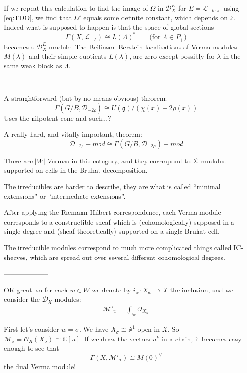 \documentclass[12pt]{article}
\theoremstyle{plain}
\theoremstyle{definition}
\numberwithin{equation}{section}
\newcommand{\M}{\mathcal{M}}
\newcommand{\bbA}{\mathbb{A}}
\newcommand{\la}{\lambda}
\newcommand{\La}{\Lambda}
\newcommand{\Om}{\Omega}
\newcommand{\C}{\mathbb{C}}
\newcommand{\g}{\mathfrak{g}}
\newcommand{\CD}{\mathcal{D}}
\newcommand{\CL}{\mathcal{L}}
\newcommand{\OO}{\mathcal{O}}
\begin{document}
If we repeat this calculation to find the image of $\Om$ in $\CD_X^E$ for $E = \CL_{-k\varpi}$ using \eqref{eq:TDO}, we find that $\Om'$ equals some definite constant, which depends on $k$. Indeed what is supposed to happen is that the space of global sections
\[
\Gamma(X, \CL_{-\La}) \cong L(\La)^* \qquad \text{(for $\La \in P_+$)}
\]
becomes a $\CD_X^{E}$-module. The Beilinson-Berstein localisations of Verma modules $M(\la)$ and their simple quotients $L(\la)$, are zero except possibly for $\la$ in the same weak block as $\La$.



-------------------------


A straightforward (but by no means obvious) theorem:
\[
\Gamma(G/B, \CD_{-2\rho}) \cong U(\g) / (\chi(x) + 2\rho(x))
\]
Uses the nilpotent cone and such...?

A really hard, and vitally important, theorem:
\[
\CD_{-2\rho}-mod \cong \Gamma(G/B, \CD_{-2\rho})-mod
\]

There are $|W|$ Vermas in this category, and they correspond to $\CD$-modules supported on cells in the Bruhat decomposition.

The irreducibles are harder to describe, they are what is called ``minimal extensions'' or ``intermediate extensions''.

After applying the Riemann-Hilbert correspondence, each Verma module corresponds to a constructible sheaf which is (cohomologically) supposed in a single degree and (sheaf-theoretically) supported on a single Bruhat cell.

The irreducible modules correspond to much more complicated things called IC-sheaves, which are spread out over several different cohomological degrees.

--------------------



OK great, so for each $w \in W$ we denote by $i_w : X_w \rightarrow X$ the inclusion, and we consider the $\CD_X$-modules:
\begin{align*}
\M'_w = \int_{i_w} \OO_{X_w}
\end{align*}


First let's consider $w = \sigma$. We have $X_\sigma \cong \bbA^1$ open in $X$. So $\M_\sigma = \OO_X(X_\sigma) \cong \C[u]$. If we draw the vectors $u^k$ in a chain, it becomes easy enough to see that
\[
\Gamma(X, \M'_\sigma) \cong M(0)^\vee
\]
the dual Verma module!
\end{document}
